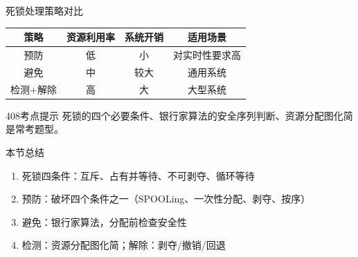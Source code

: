 \documentclass[10pt, aspectratio=169]{beamer}
\begin{document}
\begin{frame}{死锁处理策略对比}
    \begin{tabular}{|c|c|c|c|}
        \hline
        策略 & 资源利用率 & 系统开销 & 适用场景 \\
        \hline
        预防 & 低 & 小 & 对实时性要求高 \\
        避免 & 中 & 较大 & 通用系统 \\
        检测+解除 & 高 & 大 & 大型系统 \\
        \hline
    \end{tabular}
    \vspace{0.5em}
    \begin{block}{408考点提示}
        死锁的四个必要条件、银行家算法的安全序列判断、资源分配图化简是常考题型。
    \end{block}
\end{frame}

\begin{frame}{本节总结}
    \begin{enumerate}
        \item 死锁四条件：互斥、占有并等待、不可剥夺、循环等待
        \item 预防：破坏四个条件之一（SPOOLing、一次性分配、剥夺、按序）
        \item 避免：银行家算法，分配前检查安全性
        \item 检测：资源分配图化简；解除：剥夺/撤销/回退
    \end{enumerate}
\end{frame}
\end{document}

